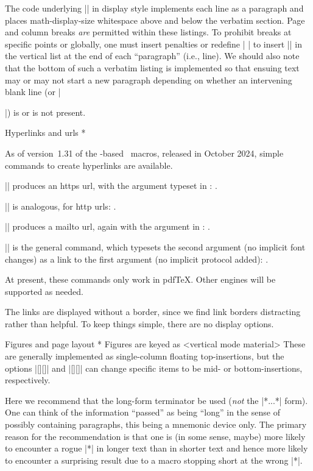 {The code underlying |\verbatim| in display style implements each line
as a paragraph and places math-display-size whitespace above and
below the verbatim section.  Page and column breaks {\it are\/}
permitted within these listings.  To prohibit breaks at specific
points or globally, one must insert penalties or redefine |^^M| to
insert |\nobreak| in the vertical list at the end of each
``paragraph'' (i.e., line).  We should also note that the bottom of
such a verbatim listing is implemented so that ensuing
text may or may not start a new paragraph depending on whether an
intervening blank line (or |\par|) is or is not present.


\subhead * Hyperlinks and urls *

As of version~1.31 of the \plain-based \TUB\ macros, released in October
2024, simple commands to create hyperlinks are available.

\list\raggedright
\item || produces an https url, with the argument
      typeset in : .
\item || is analogous, for http urls: .
\item || produces a mailto url, again with the
      argument in : .
\item || is the general
      command, which typesets the second argument (no implicit font
      changes) as a link to the first argument (no implicit protocol
      added): .
\endlist

At present, these commands only work in pdf\TeX. Other engines will be
supported as needed.

The links are displayed without a border, since we find link borders
distracting rather than helpful. To keep things simple, there are no
display options.

\subhead * Figures and page layout *
Figures are keyed as
\verbatim[\makeescape\|]
\figure
<vertical mode material>
\endfigure
\endverbatim
These are generally implemented as single-column floating
top-insertions, but the options |[\lastoption][\mid]| and
|[\lastoption][\bot]| can change specific items to be mid- or
bottom-insertions, respectively.

Here we recommend that the long-form terminator be used ({\it not\/} the
|*...*| form). One can think of the information ``passed'' as being
``long'' in the sense of possibly containing paragraphs, this being a
mnemonic device only. The primary reason for the recommendation is that
one is (in some sense, maybe) more likely to encounter a rogue |*| in
longer text than in shorter text and hence more likely to encounter a
surprising result due to a macro stopping short at the wrong |*|.

}

